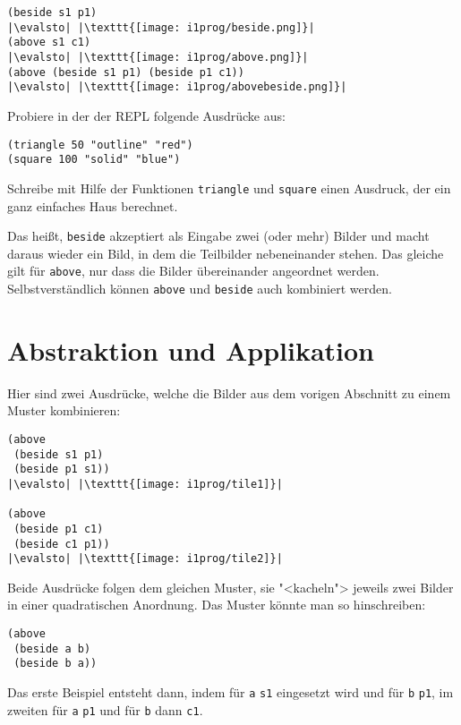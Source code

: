 %
\begin{lstlisting}
(beside s1 p1)
|\evalsto| |\texttt{[image: i1prog/beside.png]}|
(above s1 c1)
|\evalsto| |\texttt{[image: i1prog/above.png]}|
(above (beside s1 p1) (beside p1 c1))
|\evalsto| |\texttt{[image: i1prog/abovebeside.png]}|
\end{lstlisting}
%
\begin{aufgabeinline}
  Probiere in der der REPL folgende Ausdrücke aus:
\begin{lstlisting}
(triangle 50 "outline" "red")
(square 100 "solid" "blue")
\end{lstlisting}
  Schreibe mit Hilfe der Funktionen \lstinline{triangle} und
  \lstinline{square} einen Ausdruck, der ein ganz einfaches Haus
  berechnet.
\end{aufgabeinline}
%
Das heißt, \lstinline{beside} akzeptiert als Eingabe zwei (oder mehr)
Bilder und macht daraus wieder ein Bild, in dem die Teilbilder
nebeneinander stehen.  Das gleiche gilt für \lstinline{above}, nur dass
die Bilder übereinander angeordnet werden.  Selbstverständlich können
\lstinline{above} und \lstinline{beside} auch kombiniert werden.

\section{Abstraktion und Applikation}
\label{sec:abstraktion-und-applikation}

Hier sind zwei Ausdrücke, welche die Bilder aus dem vorigen Abschnitt
zu einem Muster kombinieren:
%
\begin{lstlisting}
(above
 (beside s1 p1)
 (beside p1 s1))
|\evalsto| |\texttt{[image: i1prog/tile1]}|

(above
 (beside p1 c1)
 (beside c1 p1))
|\evalsto| |\texttt{[image: i1prog/tile2]}|
\end{lstlisting}
%
Beide Ausdrücke folgen dem gleichen Muster, sie "<kacheln"> jeweils zwei
Bilder in einer quadratischen Anordnung.  Das Muster könnte man so
hinschreiben:
%
\begin{lstlisting}
(above
 (beside a b)
 (beside b a))
\end{lstlisting}
%
Das erste Beispiel entsteht dann, indem für \lstinline{a} \lstinline{s1}
eingesetzt wird und für \lstinline{b} \lstinline{p1}, im zweiten für \lstinline{a}
\lstinline{p1} und für \lstinline{b} dann \lstinline{c1}.

